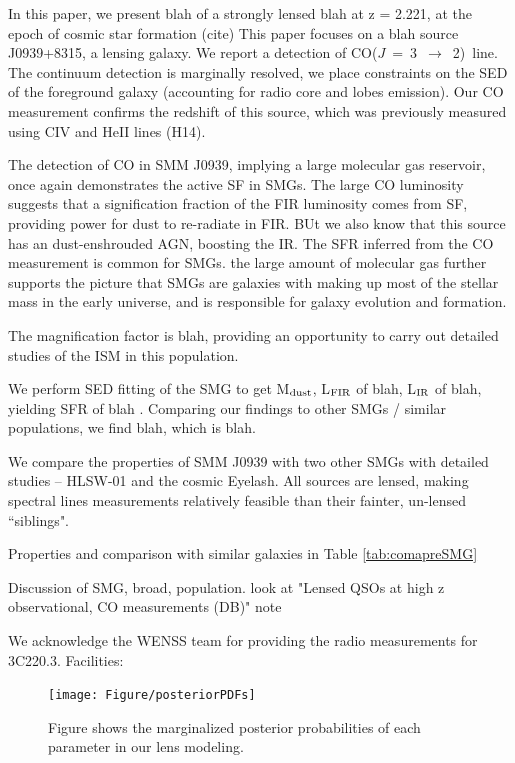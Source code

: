 \documentclass{emulateapj}
\newcommand{\CO}{\mbox{CO($J$ = 3 $\rightarrow$ 2) }}
\begin{document}
In this paper, we present blah of a strongly lensed blah at z = 2.221, at the epoch of cosmic star formation (cite)
This paper focuses on a blah source J0939+8315, a lensing galaxy.
We report a detection of \CO line.
The continuum detection is marginally resolved, we place constraints on the SED of the foreground galaxy (accounting for radio 
core and lobes emission). Our CO measurement confirms the redshift of this source, which was previously measured using CIV and HeII lines (H14).

The detection of CO in SMM J0939, implying a large molecular gas reservoir, once again demonstrates the active SF in SMGs. 
The large CO luminosity suggests that a signification fraction of the FIR luminosity comes from SF, providing power for dust to re-radiate in FIR. BUt we also know that this source has an dust-enshrouded AGN, boosting the IR.
The SFR inferred from the CO measurement is common for SMGs. the large amount of molecular gas further supports the picture that SMGs are galaxies with making up most of the stellar mass in the early universe, and is responsible for galaxy evolution and formation. 

The magnification factor is blah, providing an opportunity to carry out detailed studies of the ISM in this population.

We perform SED fitting of the SMG to get M$_{\rm dust}$, L$_{\rm FIR}$ of blah, L$_{\rm IR}$ of blah, yielding SFR of 
blah . Comparing our findings to other SMGs / similar populations, we find blah, which is blah.

We compare the properties of SMM J0939 with two other SMGs with detailed studies -- HLSW-01 and the cosmic Eyelash. All sources are lensed, making spectral lines measurements relatively feasible than their fainter, un-lensed ``siblings". 

Properties and comparison with similar galaxies in Table \ref{tab:comapreSMG}

Discussion of SMG, broad, population.
look at "Lensed QSOs at high z observational, CO measurements (DB)" note

\acknowledgments

We acknowledge the WENSS team for providing the radio measurements for 3C220.3.
Facilities: 




\appendix

\begin{figure}[!tbp]
\centering
\texttt{[image: Figure/posteriorPDFs]}
\caption{Figure shows the marginalized posterior probabilities of each parameter in our lens modeling.
\label{fig:LensPDF}}
\end{figure}
\end{document}
